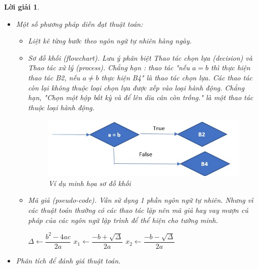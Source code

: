 \documentclass[14pt, a4paper]{article}
\theoremstyle{sltheorem}
\theoremstyle{soltheorem}
\newtheorem*{loigiai}{Lời giải}
\begin{document}
\begin{loigiai}
\begin{enumerate}[a)]
\begin{itemize}
                \item Một số phương pháp diễn đạt thuật toán:
                \begin{itemize}
                    \item Liệt kê từng bước theo ngôn ngữ tự nhiên hàng ngày. 
                    \item Sơ đồ khối (flowchart). Lưu ý phân biệt Thao tác chọn lựa (decision) và Thao tác xử lý (process). Chẳng hạn : thao tác "nếu $a=b$ thì thực hiện thao tác B2, nếu $a \neq b$ thực hiện B4" là thao tác chọn lựa. Các thao tác còn lại không thuộc loại chọn lựa được xếp vào loại hành động. Chẳng hạn, "Chọn một hộp bất kỳ và để lên dĩa cân còn trống." là một thao tác thuộc loại hành động.
                    \begin{figure}[h!]
                        \centering
                        \includegraphics[scale=0.8]{flowchart.jpg}
                        \caption{Ví dụ minh họa sơ đồ khối}
                    \end{figure}
                    \item Mã giả (pseudo-code). Vẫn sử dụng 1 phần ngôn ngữ tự nhiên. Nhưng vì các thuật toán thường có các thao tác lặp nên mã giả hay vay mượn cú pháp của các ngôn ngữ lập trình để thể hiện cho tường minh.
                    \begin{algorithm}[h!]
                        \DontPrintSemicolon
                        $\Delta \gets \dfrac{b^2 - 4ac}{2a}$\;
                         {
                            $x_1 \gets \dfrac{-b + \sqrt{\Delta}}{2a}$\;
                            $x_2 \gets \dfrac{-b - \sqrt{\Delta}}{2a}$\;
                            \;
                        } 
                        \caption{Mã giả thuật toán giải phương trình bậc 2}
                    \end{algorithm}  
                \end{itemize}
                \item Phân tích để đánh giá thuật toán.
                

\end{itemize}
\end{enumerate}
\end{loigiai}
\end{document}
